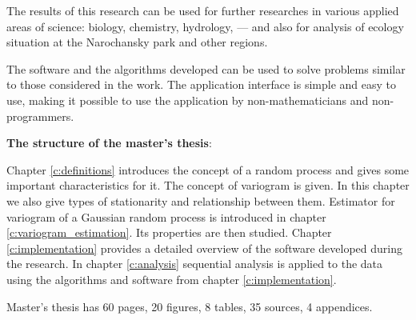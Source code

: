 The results of this research can be used for further researches in various applied areas of science: biology, chemistry, hydrology, --- and also for analysis of ecology situation at the Narochansky park and other regions.

The software and the algorithms developed can be used to solve problems similar to those considered in the work. The application interface is simple and easy to use, making it possible to use the application by non-mathematicians and non-programmers.

\textbf{The structure of the master's thesis}:

Chapter \ref{c:definitions} introduces the concept of a random process and gives some important characteristics for it. The concept of variogram is given. In this chapter we also give types of stationarity and relationship between them. Estimator for variogram of a Gaussian random process is introduced in chapter \ref{c:variogram_estimation}. Its properties are then studied. Chapter \ref{c:implementation} provides a detailed overview of the software developed during the research. In chapter \ref{c:analysis} sequential analysis is applied to the data using the algorithms and software from chapter \ref{c:implementation}.

Master's thesis has 60 pages, 20 figures, 8 tables, 35 sources, 4 appendices.
